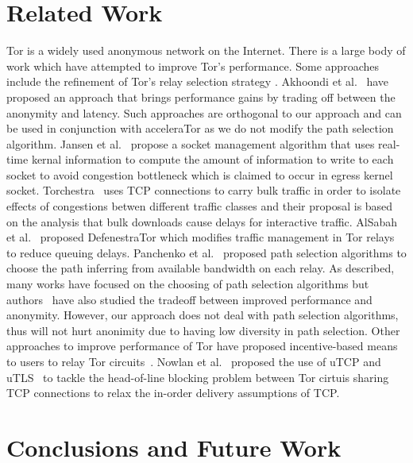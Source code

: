 \documentclass[conference]{IEEEtran}
\begin{document}
\section{Related Work}
\label{sec:re-work}
Tor is a widely used anonymous network on the Internet. There is a large body of work which have attempted to improve Tor’s performance. Some approaches include the refinement of Tor’s relay selection strategy \cite{6679287, Sherr10a3:an, Snader08atune-up}. Akhoondi et al.~\cite{6679287} have proposed an approach that brings performance gains by trading off between the anonymity and latency. Such approaches are orthogonal to our approach and can be used in conjunction with acceleraTor as we do not modify the path selection algorithm.
Jansen et al.~\cite{184431} propose a socket management algorithm that uses real-time kernal information to compute the amount of information to write to each socket to avoid congestion bottleneck which is claimed to occur in egress kernel socket.
Torchestra~\cite{Gopal:2012:TRI:2381966.2381972} uses TCP connections to carry bulk traffic in order to isolate effects of congestions betwen different traffic classes and their proposal is based on the analysis that bulk downloads cause delays for interactive traffic. 
AlSabah et al.~\cite{AlSabah:2011:DTO:2032162.2032170} proposed DefenestraTor which modifies traffic management in Tor relays to reduce queuing delays. Panchenko et al.~\cite{5230652} proposed path selection algorithms to choose the path inferring from available bandwidth on each relay.  
As described, many works have focused on the choosing of path selection algorithms but authors~\cite{Panchenko:2008:PAA:1371602.1371906} have also studied the tradeoff between improved performance and anonymity. However, our approach does not deal with path selection algorithms, thus will not hurt anonimity due to having low diversity in path selection. Other approaches to improve performance of Tor have proposed  incentive-based means to users to relay Tor circuits~\cite{Jansen:2010:RNT:1866307.1866344, Jansen_lira:lightweight}. Nowlan et al.~\cite{179191} proposed the use of uTCP and uTLS~\cite{180706} to tackle the head-of-line blocking problem between Tor cirtuis sharing TCP connections to relax the in-order delivery assumptions of TCP. 

\section{Conclusions and Future Work}
\label{sec:conclusions}

% 
% 
% 
% 
% 




\end{document}
